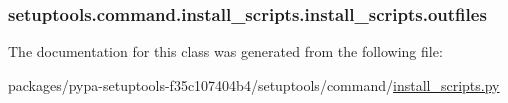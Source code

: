 \subsubsection[{outfiles}]{\setlength{\rightskip}{0pt plus 5cm}setuptools.\+command.\+install\+\_\+scripts.\+install\+\_\+scripts.\+outfiles}\label{classsetuptools_1_1command_1_1install__scripts_1_1install__scripts_a1405b8119b7dce643aeb6f477bd7947f}


The documentation for this class was generated from the following file\+:\begin{DoxyCompactItemize}
\item 
packages/pypa-\/setuptools-\/f35c107404b4/setuptools/command/\hyperlink{install__scripts_8py}{install\+\_\+scripts.\+py}\end{DoxyCompactItemize}
